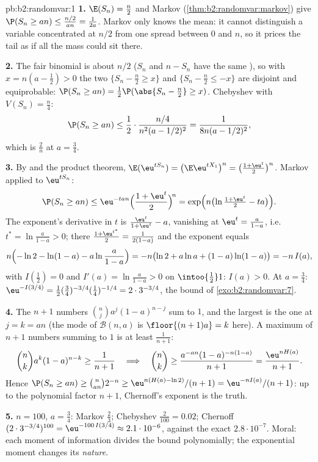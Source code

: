 \begin{solution}{pb:b2:randomvar:1}
\textbf{1.} $\E(S_n) = \frac n2$ and Markov
(\cref{thm:b2:randomvar:markov}) give $\P(S_n \geq an) \leq
\frac{n/2}{an} = \frac1{2a}$. Markov only knows the mean: it
cannot distinguish a variable concentrated at $n/2$ from one
spread between $0$ and $n$, so it prices the tail as if all
the mass could sit there.

\textbf{2.} The fair binomial is  about $n/2$
($S_n$ and $n - S_n$ have the same ), so with $x = n(a -
\frac12) > 0$ the two  $\{S_n - \frac n2 \geq x\}$ and
$\{S_n - \frac n2 \leq -x\}$ are disjoint and equiprobable:
$\P(S_n \geq an) = \frac12\P(\abs{S_n - \frac n2} \geq x)$.
Chebyshev with $V(S_n) = \frac n4$:
\[
\P(S_n \geq an)
\leq \frac12\cdot\frac{n/4}{n^2(a - 1/2)^2}
= \frac1{8n(a - 1/2)^2},
\]
which is $\frac2n$ at $a = \frac34$.

\textbf{3.} By  and the product theorem,
$\E(\eu^{tS_n}) = \bigl(\E \eu^{tX_1}\bigr)^n = \bigl(\frac{1
+ \eu^t}2\bigr)^n$. Markov applied to $\eu^{tS_n}$:
\[
\P(S_n \geq an) \leq \eu^{-tan}\Bigl(\frac{1 +
\eu^t}2\Bigr)^{\!n} = \exp\Bigl(n\bigl(\ln\tfrac{1 +
\eu^t}2 - ta\bigr)\Bigr).
\]
The exponent's derivative in $t$ is $\frac{\eu^t}{1 + \eu^t}
- a$, vanishing at $\eu^t = \frac a{1-a}$, i.e.\ $t^* =
\ln\frac a{1-a} > 0$; there $\frac{1 + \eu^{t^*}}2 =
\frac1{2(1-a)}$ and the exponent equals
\[
n\Bigl(-\ln 2 - \ln(1-a) - a\ln\frac a{1-a}\Bigr)
= -n\bigl(\ln2 + a\ln a + (1-a)\ln(1-a)\bigr) = -n\,I(a),
\]
with $I(\frac12) = 0$ and $I'(a) = \ln\frac a{1-a} > 0$ on
$\intoo{\frac12}1$: $I(a) > 0$. At $a = \frac34$:
$\eu^{-I(3/4)} = \frac12(\tfrac34)^{-3/4}(\tfrac14)^{-1/4} =
2\cdot3^{-3/4}$, the bound of \cref{exo:b2:randomvar:7}.

\textbf{4.} The $n + 1$ numbers $\binom nja^j(1-a)^{n-j}$ sum
to $1$, and the largest is the one at $j = k = an$ (the mode
of $\mathcal B(n, a)$ is $\floor{(n+1)a} = k$ here). A
maximum of $n + 1$ numbers summing to $1$ is at least
$\frac1{n+1}$:
\[
\binom nk a^k(1-a)^{n-k} \geq \frac1{n+1}
\quad\Longrightarrow\quad
\binom nk \geq \frac{a^{-an}(1-a)^{-n(1-a)}}{n+1}
= \frac{\eu^{nH(a)}}{n+1}.
\]
Hence $\P(S_n \geq an) \geq \binom{n}{an}2^{-n} \geq
\eu^{n(H(a) - \ln2)}/(n+1) = \eu^{-nI(a)}/(n+1)$: up to the
polynomial factor $n + 1$, Chernoff's exponent is the truth.

\textbf{5.} $n = 100$, $a = \frac34$: Markov $\frac23$;
Chebyshev $\frac2{100} = 0.02$; Chernoff
$(2\cdot3^{-3/4})^{100} = \eu^{-100\,I(3/4)} \approx
2.1\cdot10^{-6}$, against the exact $2.8\cdot10^{-7}$. Moral:
each moment of information divides the bound polynomially;
the exponential moment changes its \emph{nature}.


\end{solution}
